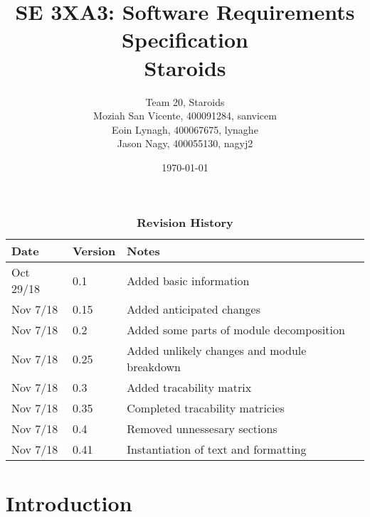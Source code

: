 \documentclass[12pt, titlepage]{article}
\title{SE 3XA3: Software Requirements Specification\\Staroids}
\author{Team 20, Staroids
  \\ Moziah San Vicente, 400091284, sanvicem
  \\ Eoin Lynagh, 400067675, lynaghe
  \\ Jason Nagy, 400055130, nagyj2
}
\date{\today}
\begin{document}
\maketitle

\tableofcontents
\listoftables
\listoffigures

\begin{table}[bp]
\caption{\bf Revision History}
\begin{tabularx}{\textwidth}{p{3cm}p{2cm}X}
\toprule {\bf Date} & {\bf Version} & {\bf Notes}\\
\midrule
Oct 29/18 & 0.1 & Added basic information\\
Nov 7/18 & 0.15 & Added anticipated changes\\
Nov 7/18 & 0.2 & Added some parts of module decomposition\\
Nov 7/18 & 0.25 & Added unlikely changes and module breakdown\\
Nov 7/18 & 0.3 & Added tracability matrix\\
Nov 7/18 & 0.35 & Completed tracability matricies\\
Nov 7/18 & 0.4 & Removed unnessesary sections\\
Nov 7/18 & 0.41 & Instantiation of text and formatting\\
\bottomrule
\end{tabularx}
\end{table}

\newpage


\section{Introduction}
\end{document}
